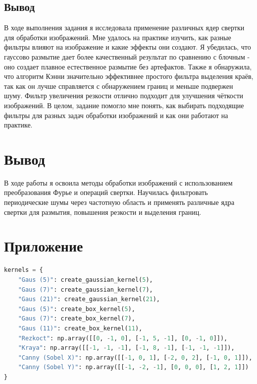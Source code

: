 \documentclass[a4paper,12pt]{article}
\begin{document}
\subsection{Вывод}

В ходе выполнения задания я исследовала применение различных ядер свертки для обработки изображений. Мне удалось на практике изучить, как разные фильтры влияют на изображение и какие эффекты они создают. Я убедилась, что гауссово размытие дает более качественный результат по сравнению с блочным - оно создает плавное естественное размытие без артефактов. Также я обнаружила, что алгоритм Кэнни значительно эффективнее простого фильтра выделения краёв, так как он лучше справляется с обнаружением границ и меньше подвержен шуму. Фильтр увеличения резкости отлично подходит для улучшения чёткости изображений. В целом, задание помогло мне понять, как выбирать подходящие фильтры для разных задач обработки изображений и как они работают на практике.

\newpage

\section{Вывод}
В ходе работы я освоила методы обработки изображений с использованием преобразования Фурье и операций свертки. Научилась фильтровать периодические шумы через частотную область и применять различные ядра свертки для размытия, повышения резкости и выделения границ.

\newpage

\section{Приложение}

\begin{lstlisting}[language=python, caption=Ядра для задания 2]
kernels = {
	"Gaus (5)": create_gaussian_kernel(5),
	"Gaus (7)": create_gaussian_kernel(7),
	"Gaus (21)": create_gaussian_kernel(21),
	"Gaus (5)": create_box_kernel(5),
	"Gaus (7)": create_box_kernel(7),
	"Gaus (11)": create_box_kernel(11),
	"Rezkoct": np.array([[0, -1, 0], [-1, 5, -1], [0, -1, 0]]),
	"Kraya": np.array([[-1, -1, -1], [-1, 8, -1], [-1, -1, -1]]),
	"Canny (Sobel X)": np.array([[-1, 0, 1], [-2, 0, 2], [-1, 0, 1]]),
	"Canny (Sobel Y)": np.array([[-1, -2, -1], [0, 0, 0], [1, 2, 1]])
}
\end{lstlisting}
\end{document}
